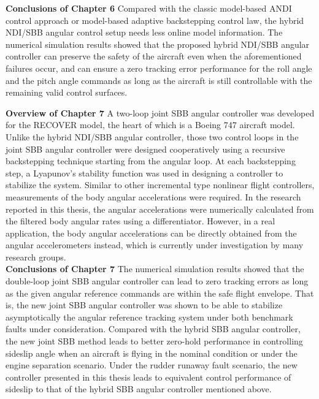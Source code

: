 \noindent \textbf{Conclusions of Chapter 6} Compared with the classic model-based \ac{ANDI} control approach or model-based adaptive backstepping control law, the hybrid NDI/SBB angular control setup needs less online model information. The numerical simulation results showed that the proposed hybrid NDI/SBB angular controller can preserve the safety of the aircraft even when the aforementioned failures occur, and can ensure a zero tracking error performance for the roll angle and the pitch angle commands as long as the aircraft is still controllable with the remaining valid control surfaces. 

\begin{shaded}
\end{shaded}
\vspace{-0.9cm}
\begin{shaded}
\end{shaded}

\noindent \textbf{Overview of Chapter 7} A two-loop joint SBB angular controller was developed for the RECOVER model, the heart of which is a Boeing 747 aircraft model. Unlike the hybrid NDI/SBB angular controller, those two control loops in the joint SBB angular controller were designed cooperatively using a recursive backstepping technique starting from the angular loop.  At each backstepping step, a Lyapunov's stability function was used in designing a controller to stabilize the system.
Similar to other incremental type nonlinear flight controllers, measurements of the body angular accelerations were required. In the research reported in this thesis, the angular accelerations were numerically calculated from the filtered body angular rates using a differentiator. However, in a real application, the body angular accelerations can be directly obtained from the angular accelerometers instead, which is currently under investigation by many research groups.\\

\noindent \textbf{Conclusions of Chapter 7} The numerical simulation results showed that the double-loop joint SBB angular controller can lead to zero tracking errors as long as the given angular reference commands are within the safe flight envelope. That is, the new joint SBB angular controller was shown to be able to stabilize asymptotically the angular reference tracking system under both benchmark faults under consideration. Compared with the hybrid SBB angular controller, the new joint SBB method leads to better zero-hold performance in controlling sideslip angle when an aircraft is flying in the nominal condition or under the engine separation scenario. Under the rudder runaway fault scenario, the new controller presented in this thesis leads to equivalent control performance of sideslip to that of the hybrid SBB angular controller mentioned above.

